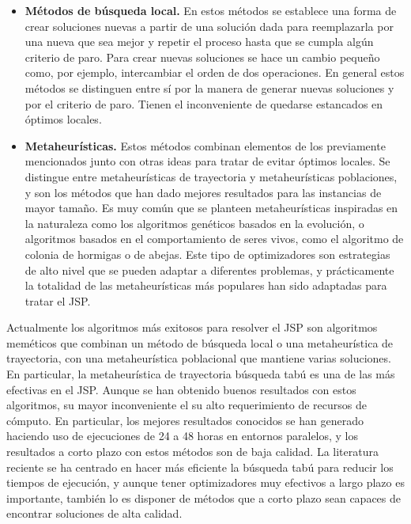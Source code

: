\begin{itemize}
\item \textbf{Métodos de búsqueda local.} En estos métodos se establece una forma de crear soluciones nuevas a partir de una solución dada para reemplazarla por una nueva 
que sea mejor y repetir el proceso hasta que se cumpla algún criterio de paro.  Para crear nuevas soluciones se hace un cambio pequeño como, por ejemplo, intercambiar el 
orden de dos operaciones.  En general estos métodos se distinguen entre sí por la manera de generar nuevas soluciones y por el criterio de paro. Tienen el inconveniente 
de quedarse estancados en óptimos locales. 

\item \textbf{Metaheurísticas.} Estos métodos combinan elementos de los previamente mencionados junto con otras ideas para tratar de evitar óptimos locales. 
Se distingue entre metaheurísticas de trayectoria y metaheurísticas poblaciones, y son los métodos que han dado mejores resultados para las instancias de mayor
tamaño. 
%
Es muy común que se planteen metaheurísticas inspiradas en la naturaleza como los algoritmos genéticos basados en la evolución, o algoritmos basados en el 
comportamiento de seres vivos, como el algoritmo de colonia de hormigas o de abejas.
%
Este tipo de optimizadores son estrategias de alto nivel que se pueden adaptar a diferentes problemas, y prácticamente la totalidad de las metaheurísticas más populares
han sido adaptadas para tratar el JSP.
\end{itemize}

Actualmente los algoritmos más exitosos para resolver el JSP son algoritmos meméticos que combinan un método de búsqueda local o una metaheurística de trayectoria,
con una metaheurística poblacional que mantiene varias soluciones. 
%
En particular, la metaheurística de trayectoria búsqueda tabú es una de las más efectivas en el JSP.
%
Aunque se han obtenido buenos resultados con estos algoritmos, su mayor inconveniente el su alto requerimiento de recursos de cómputo.
%
En particular, los mejores resultados conocidos se han generado haciendo uso de ejecuciones de 24 a 48 horas en entornos paralelos, y los resultados a corto
plazo con estos métodos son de baja calidad.
%
La literatura reciente se ha centrado en hacer más eficiente la búsqueda tabú para reducir los tiempos de ejecución, y aunque tener optimizadores muy efectivos
a largo plazo es importante, también lo es disponer de métodos que a corto plazo sean capaces de encontrar soluciones de alta calidad.

